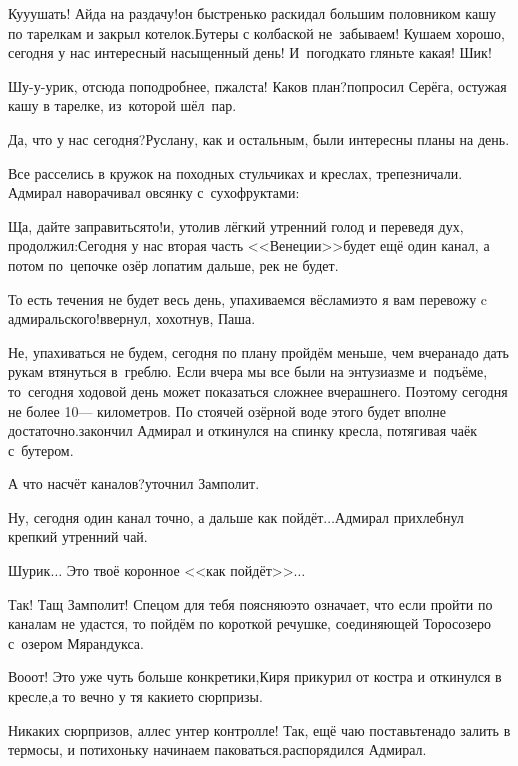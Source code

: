 \diagdash Ку\sdash у\sdash ушать! Айда на раздачу!\mdash он быстренько раскидал большим половником кашу по тарелкам и закрыл котелок.\mdash Бутеры с колбаской не~забываем! Кушаем хорошо, сегодня у нас интересный насыщенный день! И~погодка\sdash то гляньте какая! Шик!

\diagdash Шу-у-урик, отсюда поподробнее, п\sdash жалста! Каков план?\mdash попросил Серёга, остужая кашу в тарелке, из~которой шёл~пар.

\diagdash Да, что у нас сегодня?\mdash Руслану, как и остальным, были интересны планы на день.

Все расселись в кружок на походных стульчиках и креслах, трепезничали. Адмирал наворачивал овсянку с~сухофруктами:

\diagdash Ща, дайте заправиться\sdash то!\mdash и, утолив лёгкий утренний голод и переведя дух, продолжил:\mdash Сегодня у нас вторая часть <<Венеции>>\mdash будет ещё один канал, а потом по~цепочке озёр лопатим дальше, рек не будет.

\diagdash То есть течения не будет весь день, упахиваемся вёслами\mdash это я вам перевожу c адмиральского!\mdash ввернул, хохотнув, Паша.

\diagdash Не, упахиваться не будем, сегодня по плану пройдём меньше, чем вчера\mdash надо дать рукам втянуться в~греблю. Если вчера мы все были на энтузиазме и~подъёме, то~сегодня ходовой день может показаться сложнее вчерашнего. Поэтому сегодня не более 10\thinspace\nobreakdash--- километров. По стоячей озёрной воде этого будет вполне достаточно.\mdash закончил Адмирал и откинулся на спинку кресла, потягивая чаёк с~бутером.

\diagdash А что насчёт каналов?\mdash уточнил Замполит.

\diagdash Ну, сегодня один канал точно, а дальше как пойдёт$\ldots$\mdash Адмирал прихлебнул крепкий утренний чай.

\diagdash Шурик$\ldots$ Это твоё коронное <<как пойдёт>>$\ldots$

\diagdash Так! Тащ Замполит! Спецом для тебя поясняю\mdash это означает, что если пройти по каналам не удастся, то пойдём по короткой речушке, соединяющей Торосозеро с~озером Мярандукса.

\diagdash Во\sdash о\sdash от! Это уже чуть больше конкретики,\mdash Киря прикурил от костра и откинулся в кресле,\mdash а то вечно у тя какие\sdash то сюрпризы.

\diagdash Никаких сюрпризов, аллес унтер контролле! Так, ещё чаю поставьте\mdash надо залить в термосы, и потихоньку начинаем паковаться.\mdash распорядился Адмирал.

